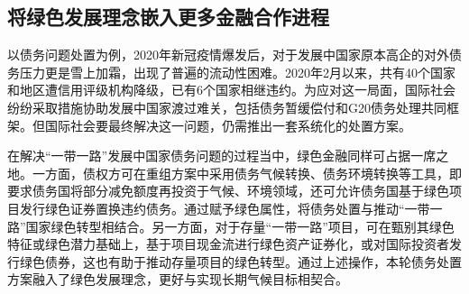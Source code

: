 \subsection*{将绿色发展理念嵌入更多金融合作进程}
以债务问题处置为例，2020年新冠疫情爆发后，对于发展中国家原本高企的对外债务压力更是雪上加霜，出现了普遍的流动性困难。2020年2月以来，共有40个国家和地区遭信用评级机构降级，已有6个国家相继违约。为应对这一局面，国际社会纷纷采取措施协助发展中国家渡过难关，包括债务暂缓偿付和G20债务处理共同框架。但国际社会要最终解决这一问题，仍需推出一套系统化的处置方案。

在解决“一带一路”发展中国家债务问题的过程当中，绿色金融同样可占据一席之地。一方面，债权方可在重组方案中采用债务气候转换、债务环境转换等工具，即要求债务国将部分减免额度再投资于气候、环境领域，还可允许债务国基于绿色项目发行绿色证券置换违约债务。通过赋予绿色属性，将债务处置与推动“一带一路”国家绿色转型相结合。另一方面，对于存量“一带一路”项目，可在甄别其绿色特征或绿色潜力基础上，基于项目现金流进行绿色资产证券化，或对国际投资者发行绿色债券，这也有助于推动存量项目的绿色转型。通过上述操作，本轮债务处置方案融入了绿色发展理念，更好与实现长期气候目标相契合。
